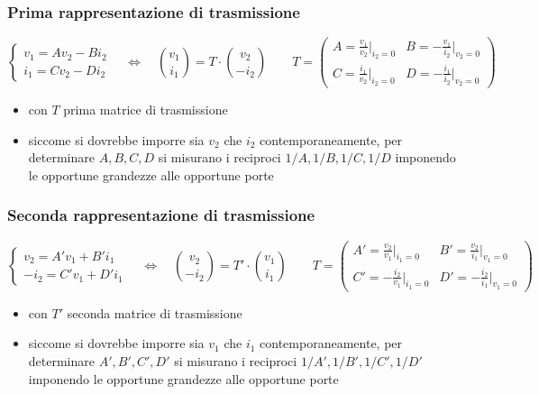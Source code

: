 \documentclass[a4paper]{article}
\begin{document}
\subsubsection*{Prima rappresentazione di trasmissione}
\[\begin{cases}
	v_1 = A v_2 - B i_2 \\
	i_1 = C v_2 - D i_2
\end{cases} \quad \Leftrightarrow \quad
\binom{v_1}{i_1} = T \cdot \binom{v_2}{-i_2} \qquad
T = \left( \begin{matrix}
	A = \frac{v_1}{v_2} \Big|_{i_2=0} & B = -\frac{v_1}{i_2} \Big|_{v_2=0} \\[8pt]
	C = \frac{i_1}{v_2} \Big|_{i_2=0} & D = -\frac{i_1}{i_2} \Big|_{v_2=0}
\end{matrix} \right)\]
\begin{itemize}
	\item con \(T\) prima matrice di trasmissione
	\item siccome si dovrebbe imporre sia \(v_2\) che \(i_2\) contemporaneamente, per determinare \(A, B, C, D\) si misurano
	i reciproci \(1/A, 1/B, 1/C, 1/D\) imponendo le opportune grandezze alle opportune porte
\end{itemize}

\subsubsection*{Seconda rappresentazione di trasmissione}
\[\begin{cases}
	v_2 = A' v_1 + B' i_1 \\
	-i_2 = C' v_1 + D' i_1
\end{cases} \quad \Leftrightarrow \quad
\binom{v_2}{-i_2} = T' \cdot \binom{v_1}{i_1} \qquad
T = \left( \begin{matrix}
	A' = \frac{v_2}{v_1} \Big|_{i_1=0} & B' = \frac{v_2}{i_1} \Big|_{v_1=0} \\[8pt]
	C' = -\frac{i_2}{v_1} \Big|_{i_1=0} & D' = -\frac{i_2}{i_1} \Big|_{v_1=0}
\end{matrix} \right)\]
\begin{itemize}
	\item con \(T'\) seconda matrice di trasmissione
	\item siccome si dovrebbe imporre sia \(v_1\) che \(i_1\) contemporaneamente, per determinare \(A', B', C', D'\) si misurano
	i reciproci \(1/A', 1/B', 1/C', 1/D'\) imponendo le opportune grandezze alle opportune porte
\end{itemize}
\end{document}
